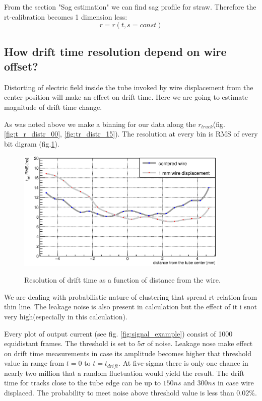 \documentclass[]{article}
\begin{document}
	From the section "Sag estimation" we can find sag profile for straw. Therefore the rt-calibration becomes 1 dimension less:
	\begin{equation}
		r = r(t,s=const)
	\end{equation}
	
	
	\subsection{How drift time resolution depend on wire offset?}
	
	Distorting of electric field inside the tube invoked by wire displacement from the center position will make an effect on drift time. Here we are going to estimate magnitude of drift time change.
	
	As was noted above we make a binning  for our data along the $r_{track}$(fig. \ref{fig:t_r_distr_00}, \ref{fig:tr_distr_15}). The resolution at every bin  is RMS of every bit digram (fig.\ref{fig:driftTimeResolutionEvo}).
	
	\begin{figure}[h!]
		\centering
		\includegraphics[width=0.9\textwidth]{DTimeRMS2}
		\label{fig:driftTimeResolutionEvo}
		\caption{Resolution of drift time as a function of distance from the wire.}
	\end{figure}
	
	We are dealing with probabilistic  nature of clustering that spread rt-relation from thin line. The leakage noise is also present in calculation but the effect of it i snot very high(especially in this calculation).
	
	Every plot of output current (see fig. \ref{fig:signal_example}) consist of 1000 equidistant frames. The threshold is set to $5\sigma$ of noise. Leakage nose make effect on drift time measurements in case its amplitude becomes higher that threshold value in range from $t=0$ to $t= t_{drift}$. At five-sigma there is only one chance in nearly two million that a random fluctuation would yield the result. The drift time for tracks close to the tube edge can be up to $150 ns$ and $300 ns$ in case wire displaced. The probability to meet noise above threshold value is less than $0.02\%$.
	
\end{document}
